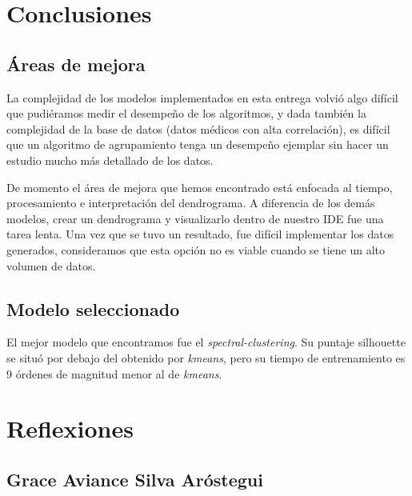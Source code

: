 \documentclass[journal]{IEEEtran}
\begin{document}
    \vspace*{4mm}    
    \section{Conclusiones} \label{conclusiones}
        
        \subsection{Áreas de mejora} \label{improvements}
        
            La complejidad de los modelos implementados en esta entrega volvió algo difícil que pudiéramos medir el desempeño de los algoritmos, y dada también la complejidad de la base de datos (datos médicos con alta correlación), es difícil que un algoritmo de agrupamiento tenga un desempeño ejemplar sin hacer un estudio mucho más detallado de los datos.
            
            De momento el área de mejora que hemos encontrado está enfocada al tiempo, procesamiento e interpretación del dendrograma. A diferencia de los demás modelos, crear un dendrograma y visualizarlo dentro de nuestro IDE fue una tarea lenta. Una vez que se tuvo un resultado, fue difícil implementar los datos generados, consideramos que esta opción no es viable cuando se tiene un alto volumen de datos.
            
        \subsection{Modelo seleccionado} \label{selected-model}
            
            El mejor modelo que encontramos fue el \emph{spectral-clustering}. Su puntaje silhouette se situó por debajo del obtenido por \emph{kmeans}, pero su tiempo de entrenamiento es 9 órdenes de magnitud menor al de \emph{kmeans}.
    
    \vspace*{4mm}        
    \section{Reflexiones} \label{thoughts}
    \vspace*{2mm}
    
        \subsection{Grace Aviance Silva Aróstegui}
        
\end{document}
